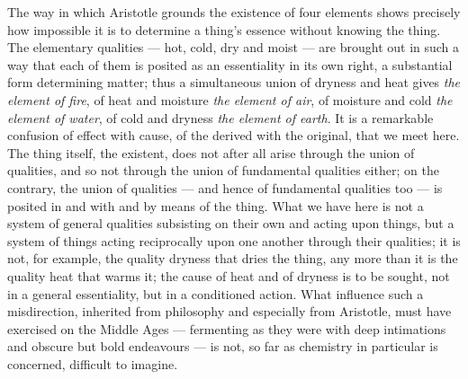 \documentclass[12pt,a4paper]{book}
\begin{document}
The way in which Aristotle grounds the existence of four elements shows
precisely how impossible it is to determine a thing's essence without knowing
the thing. The elementary qualities --- hot, cold, dry and moist --- are
brought out in such a way that each of them is posited as an essentiality in
its own right, a substantial form determining matter; thus a simultaneous union
of dryness and heat gives \emph{the element of fire}, of heat and moisture
\emph{the element of air}, of moisture and cold \emph{the element of water}, of
cold and dryness \emph{the element of earth}. It is a remarkable confusion of
effect with cause, of the derived with the original, that we meet here. The
thing itself, the existent, does not after all arise through the union of
qualities, and so not through the union of fundamental qualities either; on the
contrary, the union of qualities --- and hence of fundamental qualities too ---
is posited in and with and by means of the thing. What we have here is not a
system of general qualities subsisting on their own and acting upon things, but
a system of things acting reciprocally upon one another through their
qualities; it is not, for example, the quality dryness that dries the thing,
any more than it is the quality heat that warms
it; the cause of heat and of dryness is to be sought, not in a general
essentiality, but in a conditioned action. What influence such a misdirection,
inherited from philosophy and especially from Aristotle, must have exercised on
the Middle Ages --- fermenting as they were with deep intimations and obscure
but bold endeavours --- is not, so far as chemistry in particular is concerned,
difficult to imagine.
\end{document}
